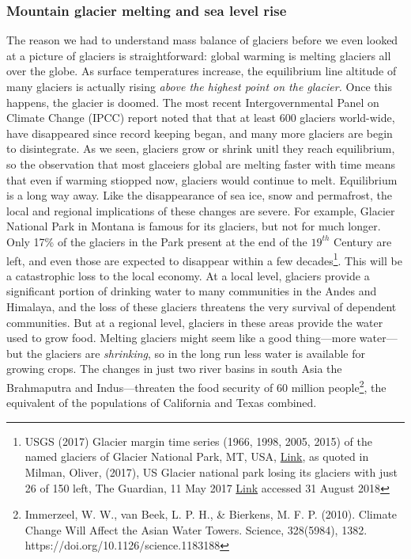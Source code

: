 \subsubsection{Mountain glacier melting and sea level rise}
The reason we had to understand mass balance of glaciers before we even looked at a picture of glaciers is straightforward: global warming is melting glaciers all over the globe. As surface temperatures increase, the equilibrium line altitude of many glaciers is actually rising \emph{above the highest point on the glacier.} Once this happens, the glacier is doomed. The most recent Intergovernmental Panel on Climate Change (IPCC) report noted that that at least 600 glaciers world-wide, have disappeared since record keeping began, and many more glaciers are begin to disintegrate. As we seen, glaciers grow or shrink unitl they reach equilibrium, so the observation that most glaceiers global are melting faster with time means that even if warming stiopped now, glaciers would continue to melt. Equilibrium is a long way away. Like the disappearance of sea ice, snow and permafrost, the local and regional implications of these changes are severe. For example, Glacier National Park in Montana is famous for its glaciers, but not for much longer. Only 17\% of the glaciers in the Park present at the end of the $19^{th}$ Century are left, and even those are expected to disappear within a few decades\footnote{USGS (2017) Glacier margin time series (1966, 1998, 2005, 2015) of the named glaciers of Glacier National Park, MT, USA, \href{doi:10.5066/F7P26WB1}{Link}, as quoted in Milman, Oliver, (2017), US Glacier national park losing its glaciers with just 26 of 150 left, The Guardian, 11 May 2017 \href{https://www.theguardian.com/environment/2017/may/11/us-glacier-national-park-is-losing-its-glaciers-with-just-26-of-150-left}{Link} accessed 31 August 2018 }. This will be a catastrophic loss to the local economy. At a local level, glaciers provide a significant portion of drinking water to many communities in the Andes and Himalaya, and the loss of these glaciers threatens the very survival of dependent communities. But at a regional level, glaciers in these areas provide the water used to grow food. Melting glaciers might seem like a good thing---more water---but the glaciers are \emph{shrinking}, so in the long run less water is available for growing crops. The changes in just two river basins in south Asia the Brahmaputra and Indus---threaten the food security of 60 million people\footnote{Immerzeel, W. W., van Beek, L. P. H., \& Bierkens, M. F. P. (2010). Climate Change Will Affect the Asian Water Towers. Science, 328(5984), 1382. https://doi.org/10.1126/science.1183188
}, the equivalent of the populations of California and Texas combined.\\   
